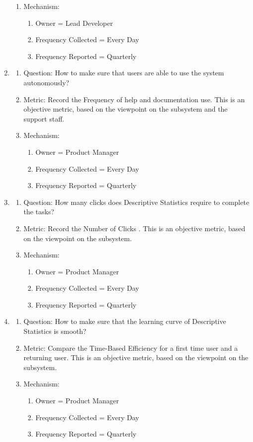 \documentclass[11pt]{article}
\begin{document}
\begin{enumerate}
\begin{enumerate}
    \item Mechanism:
	\begin{enumerate}
    \item Owner = Lead Developer
    \item Frequency Collected = Every Day
    \item Frequency Reported = Quarterly
    \end{enumerate}
\end{enumerate}
\item
	\begin{enumerate}
    \item Question: How to make sure that users are able to use the system autonomously?
    \item Metric: Record the Frequency of help and documentation use. This is an objective metric, based on the viewpoint on the subsystem and the support staff.
    \item Mechanism:
	\begin{enumerate}
    \item Owner = Product Manager
    \item Frequency Collected = Every Day
    \item Frequency Reported = Quarterly
    \end{enumerate}
\end{enumerate}
\item
	\begin{enumerate}
    \item Question: How many clicks does Descriptive Statistics require to complete the tasks?
    \item Metric: Record the Number of Clicks \cite{kelkar}. This is an objective metric, based on the viewpoint on the subsystem.
    \item Mechanism:
	\begin{enumerate}
    \item Owner = Product Manager
    \item Frequency Collected = Every Day
    \item Frequency Reported = Quarterly
    \end{enumerate}
\end{enumerate}
\item
	\begin{enumerate}
    \item Question: How to make sure that the learning curve of Descriptive Statistics is smooth?
    \item Metric: Compare the Time-Based Efficiency \cite{mifsud} for a first time user and a returning user. This is an objective metric, based on the viewpoint on the subsystem.
    \item Mechanism:
	\begin{enumerate}
    \item Owner = Product Manager
    \item Frequency Collected = Every Day
    \item Frequency Reported = Quarterly
    \end{enumerate}
\end{enumerate}
\end{enumerate}
\end{document}
